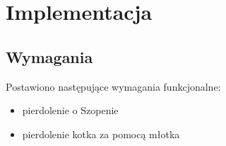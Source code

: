 \chapter{Implementacja}
\label{cha:implementacja}

\section{Wymagania}

Postawiono następujące wymagania funkcjonalne:
\begin{itemize}
	\item pierdolenie o Szopenie
	\item pierdolenie kotka za pomocą młotka
\end{itemize}
